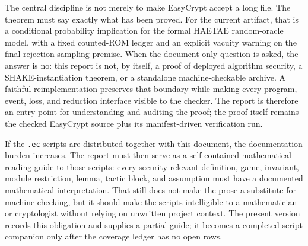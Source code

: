 \documentclass[11pt]{report}
\DeclareRobustCommand{\file}[1]{\ifmmode\text{\nolinkurl{#1}}\else\nolinkurl{#1}\fi}
\theoremstyle{definition}
\theoremstyle{plain}
\begin{document}
The central discipline is not merely to make EasyCrypt accept a long file.  The
theorem must say exactly what has been proved.  For the current artifact, that
is a conditional probability implication for the formal HAETAE random-oracle
model, with a fixed counted-ROM ledger and an explicit vacuity warning on the
final rejection-sampling premise.  When the document-only question is asked, the
answer is no: this report is not, by itself, a proof of deployed algorithm
security, a SHAKE-instantiation theorem, or a standalone machine-checkable
archive.  A faithful reimplementation preserves that boundary while making
every program, event, loss, and reduction interface visible to the checker.  The
report is therefore an entry point for understanding and auditing the proof; the
proof itself remains the checked EasyCrypt source plus its manifest-driven
verification run.

If the \file{.ec} scripts are distributed together with this document, the
documentation burden increases.  The report must then serve as a self-contained
mathematical reading guide to those scripts: every security-relevant definition,
game, invariant, module restriction, lemma, tactic block, and assumption must
have a documented mathematical interpretation.  That still does not make the
prose a substitute for machine checking, but it should make the scripts
intelligible to a mathematician or cryptologist without relying on unwritten
project context.  The present version records this obligation and supplies a
partial guide; it becomes a completed script companion only after the coverage
ledger has no open rows.
\end{document}
